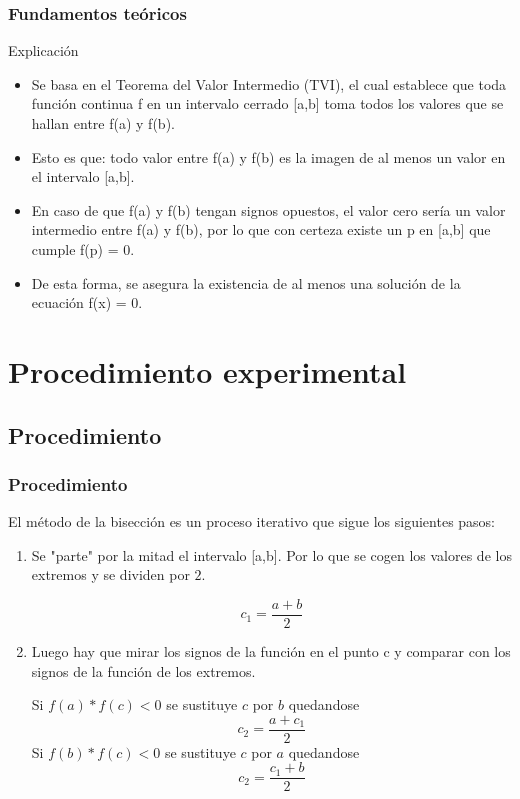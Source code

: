 \documentclass{beamer}
\begin{document}
\begin{frame}

\frametitle{Fundamentos teóricos}

\begin{block}{Explicación}
  \begin{itemize}
  \item
    Se basa en el Teorema del Valor Intermedio (TVI), el cual establece que toda función continua f en un intervalo cerrado [a,b] toma todos los valores que se hallan entre f(a) y f(b). 
  \pause

  \item
    Esto es que: todo valor entre f(a) y f(b) es la imagen de al menos un valor en el intervalo [a,b]. 
  \pause

  \item
    En caso de que f(a) y f(b) tengan signos opuestos, el valor cero sería un valor intermedio entre f(a) y f(b), por lo que con certeza existe un p en [a,b] que cumple f(p) = 0. 
  \pause

  \item
    De esta forma, se asegura la existencia de al menos una solución de la ecuación f(x) = 0.
  \end{itemize}
\end{block}

\end{frame}

\section{Procedimiento experimental}

\subsection{Procedimiento}
\begin{frame}
\frametitle{Procedimiento}
El método de la bisección es un proceso iterativo que sigue los siguientes pasos:
\begin{enumerate}
 \item
  Se "parte" por la mitad el intervalo [a,b]. Por lo que se cogen los valores de los extremos y se dividen por $2$.
  \begin{center}
   $$ c_1=\frac{a+b}{2} $$
  \end{center}
 \pause

 \item
  Luego hay que mirar los signos de la función en el punto c y comparar con los signos de la función de los extremos.
   \begin{enumerate}
    \Item
     Si $f(a)*f(c)<0$ se sustituye $c$ por $b$ quedandose $$c_2=\frac{a+c_1}{2}$$
    \Item
     Si $f(b)*f(c)<0$ se sustituye $c$ por $a$ quedandose $$c_2=\frac{c_1+b}{2}$$
   \end{enumerate}

 
\end{enumerate}
\end{frame}
\end{document}
